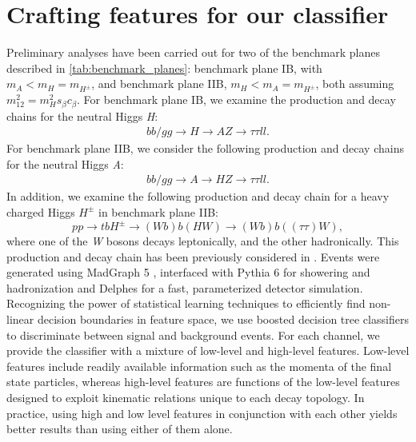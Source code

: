 {\section{Crafting features for our classifier}\label{sec:analysis_details}
Preliminary analyses have been carried out for two of the benchmark planes described in \autoref{tab:benchmark_planes}: benchmark plane IB, with $m_A < m_H = m_{H^\pm}$, and benchmark plane IIB, $m_H < m_A = m_{H^\pm}$, both assuming $m_{12}^2 = m_H^2s_\beta c_\beta$. For benchmark plane IB, we examine the production and decay chains for the neutral Higgs \emph{H}:
\begin{align*}
  bb/gg\rightarrow H\rightarrow AZ\rightarrow \tau\tau ll.
\end{align*}
For benchmark plane IIB, we consider the following production and decay chains for the neutral Higgs \emph{A}:
\begin{align*}
  bb/gg\rightarrow A\rightarrow HZ\rightarrow \tau\tau ll.
\end{align*}
In addition, we examine the following production and decay chain for a heavy charged Higgs $H^\pm$ in benchmark plane IIB:
\[pp\rightarrow tbH^\pm\rightarrow (Wb)b(HW)\rightarrow (Wb)b((\tau\tau)W),\]
where one of the \emph{W} bosons decays leptonically, and the other hadronically. This production and decay chain has been previously considered in \cite{Coleppa:2014hxa}. Events were generated using MadGraph 5 \cite{Alwall:2014hca}, interfaced with Pythia 6 \cite{Sjostrand:2006za} for showering and hadronization and Delphes \cite{deFavereau:2013fsa} for a fast, parameterized detector simulation.
Recognizing the power of statistical learning techniques to efficiently find non-linear decision boundaries in feature space, we use boosted decision tree classifiers to discriminate between signal and background events. For each channel, we provide the classifier with a mixture of low-level and high-level features. Low-level features include readily available information such as the momenta of the final state particles, whereas high-level features are functions of the low-level features designed to exploit kinematic relations unique to each decay topology. In practice, using high and low level features in conjunction with each other yields better results than using either of them alone.

}
